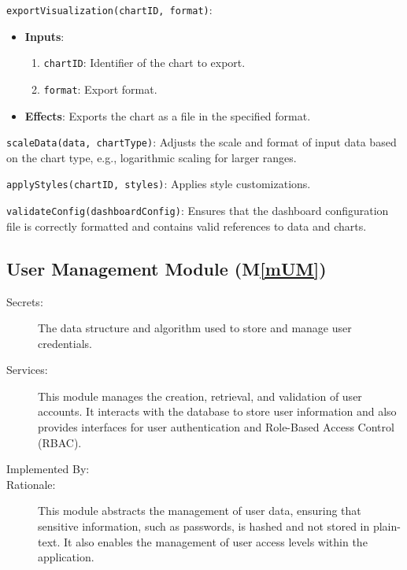 \documentclass[12pt, titlepage]{article}
\newcommand{\mref}[1]{M\ref{#1}}
\begin{document}
\begin{description}
\begin{description}
  \item \texttt{exportVisualization(chartID, format)}:
  \begin{itemize}
    \item \textbf{Inputs}:
    \begin{enumerate}
      \item \texttt{chartID}: Identifier of the chart to export.
      \item \texttt{format}: Export format.
    \end{enumerate}

    \item \textbf{Effects}: Exports the chart as a file in the specified format.
  \end{itemize}

  \item[Local Function:]
  \item \texttt{scaleData(data, chartType)}: Adjusts the scale and format of input data based on 
  the chart type, e.g., logarithmic scaling for larger ranges.
  \item \texttt{applyStyles(chartID, styles)}: Applies style customizations.
  \item \texttt{validateConfig(dashboardConfig)}: Ensures that the dashboard configuration file is 
  correctly formatted and contains valid references to data and charts.
\end{description}

\subsection{User Management Module (\mref{mUM})}
\begin{description}
  \item[Secrets:] The data structure and algorithm used to store and manage user
  credentials.
  \item[Services:]This module manages the creation, retrieval, and validation of
  user accounts. It interacts with the database to store user information and
  also provides interfaces for user authentication and Role-Based Access
  Control (RBAC).
  \item[Implemented By:] \progname{}
  \item[Rationale:] This module abstracts the management of user data, ensuring
  that sensitive information, such as passwords, is hashed and not stored in
  plain-text. It also enables the management of user access levels within the
  application. 
\end{description}


\end{description}
\end{document}
